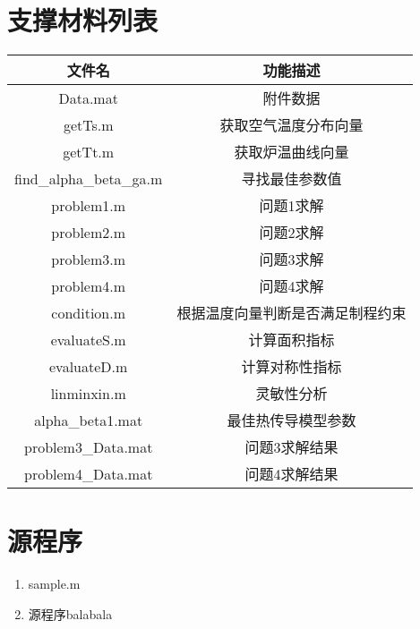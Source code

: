 \documentclass[12pt,utf8]{article}
\begin{document}
\section{支撑材料列表}
\begin{table}[htbp]
	\centering
	\begin{tabular}{cc}
		\toprule[1.5pt]
		文件名   & 功能描述 \\
		\midrule
		Data.mat & 附件数据 \\
		getTs.m & 获取空气温度分布向量 \\
		getTt.m & 获取炉温曲线向量 \\
		find\_alpha\_beta\_ga.m & 寻找最佳参数值 \\
		problem1.m & 问题1求解 \\
		problem2.m & 问题2求解 \\
		problem3.m & 问题3求解 \\
		problem4.m & 问题4求解 \\
		condition.m & 根据温度向量判断是否满足制程约束 \\
		evaluateS.m & 计算面积指标 \\
		evaluateD.m & 计算对称性指标 \\
		linminxin.m & 灵敏性分析 \\
		alpha\_beta1.mat & 最佳热传导模型参数 \\
		problem3\_Data.mat & 问题3求解结果 \\
		problem4\_Data.mat & 问题4求解结果 \\
		\bottomrule[1.5pt]
	\end{tabular}%
	\label{tab:addlabel}%
\end{table}%

\section{源程序}
 
\begin{enumerate}
\item sample.m

\item 源程序balabala
\end{enumerate}
\end{document}

